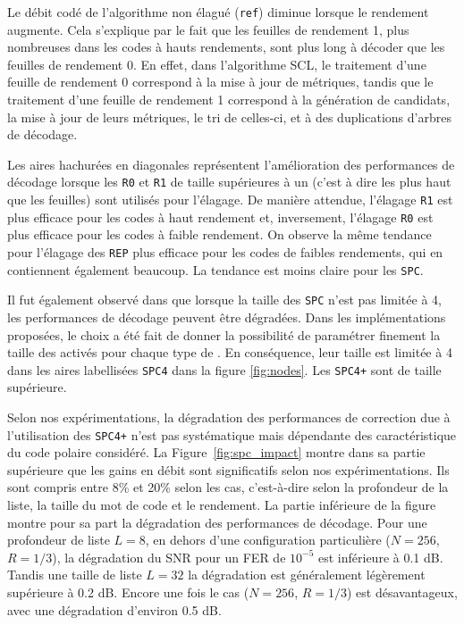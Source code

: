 Le débit codé de l'algorithme non élagué (\texttt{ref}) diminue lorsque le rendement augmente. Cela s'explique par le fait que les feuilles de rendement 1, plus nombreuses dans les codes à hauts rendements, sont plus long à décoder que les feuilles de rendement 0. En effet, dans l'algorithme SCL, le traitement d'une feuille de rendement 0 correspond à la mise à jour de métriques, tandis que le traitement d'une feuille de rendement 1 correspond à la génération de candidats, la mise à jour de leurs métriques, le tri de celles-ci, et à des duplications d'arbres de décodage.

Les aires hachurées en diagonales représentent l'amélioration des performances de décodage lorsque les \noeuds \texttt{R0} et \texttt{R1} de taille supérieures à un (c'est à dire les \noeuds plus haut que les feuilles) sont utilisés pour l'élagage. De manière attendue, l'élagage \texttt{R1} est plus efficace pour les codes à haut rendement et, inversement, l'élagage \texttt{R0} est plus efficace pour les codes à faible rendement. On observe la même tendance pour l'élagage des \noeuds \texttt{REP} plus efficace pour les codes de faibles rendements, qui en contiennent également beaucoup. La tendance est moins claire pour les \noeuds \texttt{SPC}.

Il fut également observé dans \cite{sarkis_fast_2014} que lorsque la taille des \noeuds \texttt{SPC} n'est pas limitée à 4, les performances de décodage peuvent être dégradées. Dans les implémentations proposées, le choix a été fait de donner la possibilité de paramétrer finement la taille des \noeuds activés pour chaque type de \noeuds. En conséquence, leur taille est limitée à 4 dans les aires labellisées \texttt{SPC4} dans la figure \ref{fig:nodes}. Les \noeuds \texttt{SPC4+} sont de taille supérieure.

Selon nos expérimentations, la dégradation des performances de correction due à l'utilisation des \noeuds \texttt{SPC4+} n'est pas systématique mais dépendante des caractéristique du code polaire considéré. La Figure~\ref{fig:spc_impact} montre dans sa partie supérieure que les gains en débit sont significatifs selon nos expérimentations. Ils sont compris entre 8\% et 20\% selon les cas, c'est-à-dire selon la profondeur de la liste, la taille du mot de code et le rendement. La partie inférieure de la figure montre pour sa part la dégradation des performances de décodage. Pour une profondeur de liste $L=8$, en dehors d'une configuration particulière ($N=256$, $R=1/3$), la dégradation du SNR pour un FER de $10^{-5}$ est inférieure à 0.1 dB. Tandis une taille de liste $L=32$ la dégradation est généralement légèrement supérieure à 0.2 dB. Encore une fois le cas ($N=256$, $R=1/3$) est désavantageux, avec une dégradation d'environ 0.5 dB.

